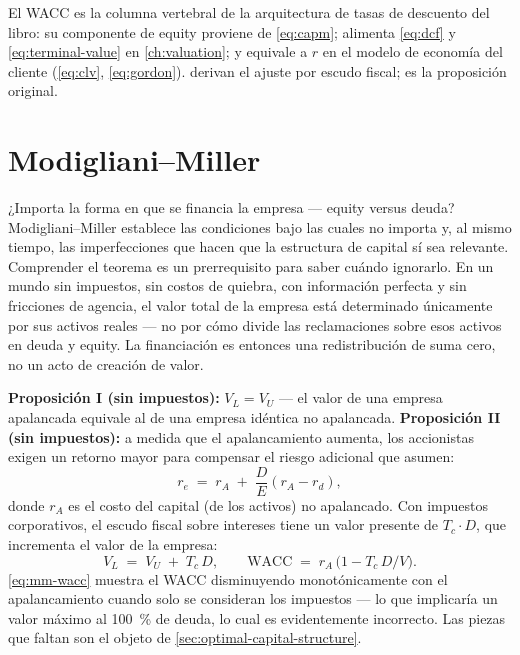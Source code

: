 El WACC es la columna vertebral de la arquitectura de tasas de descuento del libro: su componente de
equity proviene de \cref{eq:capm}; alimenta \cref{eq:dcf} y \cref{eq:terminal-value} en
\cref{ch:valuation}; y equivale a \(r\) en el modelo de economía del cliente
(\cref{eq:clv}, \cref{eq:gordon}).
\textcite{brealey2020} derivan el ajuste por escudo fiscal; \textcite{modigliani1958capital}
es la proposición original.

\section{Modigliani--Miller}\label{sec:mm}

¿Importa la forma en que se financia la empresa --- equity versus deuda? Modigliani–Miller establece
las condiciones bajo las cuales no importa y, al mismo tiempo, las imperfecciones que hacen que la
estructura de capital sí sea relevante. Comprender el teorema es un prerrequisito para saber cuándo
ignorarlo. En un mundo sin impuestos, sin costos de quiebra, con información perfecta y sin fricciones
de agencia, el valor total de la empresa está determinado únicamente por sus activos reales --- no por
cómo divide las reclamaciones sobre esos activos en deuda y equity. La financiación es entonces una
redistribución de suma cero, no un acto de creación de valor.

\textbf{Proposición I (sin impuestos):} \(V_L = V_U\) --- el valor de una empresa apalancada
equivale al de una empresa idéntica no apalancada. \textbf{Proposición II (sin impuestos):} a medida
que el apalancamiento aumenta, los accionistas exigen un retorno mayor para compensar el riesgo
adicional que asumen:
\[
  r_e \;=\; r_A \;+\; \frac{D}{E}(r_A - r_d),
\]
donde \(r_A\) es el costo del capital (de los activos) no apalancado. Con impuestos corporativos, el
escudo fiscal sobre intereses tiene un valor presente de \(T_c\cdot D\), que incrementa el valor de
la empresa:
\begin{equation}\label{eq:mm-wacc}
  V_L \;=\; V_U \;+\; T_c\,D,
  \qquad
  \mathrm{WACC} \;=\; r_A\,\bigl(1 - T_c\,D/V\bigr).
\end{equation}
\cref{eq:mm-wacc} muestra el WACC disminuyendo monotónicamente con el apalancamiento cuando solo se
consideran los impuestos --- lo que implicaría un valor máximo al \qty{100}{\percent} de deuda, lo cual
es evidentemente incorrecto. Las piezas que faltan son el objeto de \cref{sec:optimal-capital-structure}.

